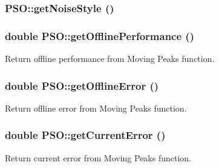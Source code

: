 \hypertarget{classPSO_f76be383f4e2360d2de466eeb6955af1}{
\subsubsection{ PSO::getNoiseStyle ()}}
\label{classPSO_f76be383f4e2360d2de466eeb6955af1}


\hypertarget{classPSO_41f18c5343c03219fe81915cd73b8f33}{
\subsubsection{\setlength{\rightskip}{0pt plus 5cm}double PSO::getOfflinePerformance ()}}
\label{classPSO_41f18c5343c03219fe81915cd73b8f33}


Return offline performance from Moving Peaks function. 

\hypertarget{classPSO_0c423a292faf4353a3039d10581f4c0e}{
\subsubsection{\setlength{\rightskip}{0pt plus 5cm}double PSO::getOfflineError ()}}
\label{classPSO_0c423a292faf4353a3039d10581f4c0e}


Return offline error from Moving Peaks function. 

\hypertarget{classPSO_a56f29351f5e977af61ffd7e79f22b1f}{
\subsubsection{\setlength{\rightskip}{0pt plus 5cm}double PSO::getCurrentError ()}}
\label{classPSO_a56f29351f5e977af61ffd7e79f22b1f}


Return current error from Moving Peaks function. 

